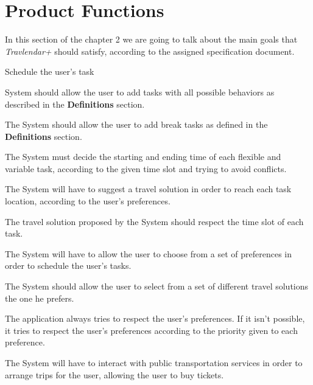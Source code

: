 \section{Product Functions}
In this section of the chapter 2 we are going to talk about the main goals that \emph{Travlendar+} should satisfy, according to the assigned specification document.

\begin{goalList}
\item \label{goal:task} Schedule the user's task

	\begin{enumerate}[label={[}G 1.\arabic*{]}]
    
    \item \label{goal:taskBehavior} System should allow the user to add tasks with all possible behaviors as described in the \textbf{Definitions} section.
    
    
    \item \label{goal:breakTask}The System should allow the user to add break tasks as defined in the \textbf{Definitions} section.
    
    \item \label{goal:noTaskConflict} The System must decide the starting and ending time of each flexible and variable task, according to the given time slot and trying to avoid conflicts.
    \item \label{goal:reachability}The System will have to suggest a travel solution in order to reach each task location, according to the user's preferences.
    \item \label{goal:timeslot}The travel solution proposed by the System should respect the time slot of each task.  
	\end{enumerate}
    
\item \label{goal:preferences}The System will have to allow the user to choose from a set of preferences in order to schedule the user's tasks. 

\item \label{goal:travel}The System should allow the user to select from a set of different travel solutions the one he prefers.

\item \label{goal:priority} The application always tries to respect the user's preferences. If it isn't possible, it tries to respect the user's preferences according to the priority given to each preference.

\item \label{goal:buyTicket}The System will have to interact with public transportation services in order to arrange trips for the user, allowing the user to buy tickets.


\end{goalList}
